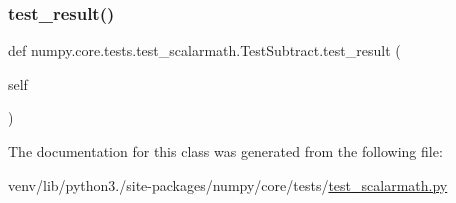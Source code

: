 \mbox{\label{classnumpy_1_1core_1_1tests_1_1test__scalarmath_1_1TestSubtract_a870a1e3e41e2d729632410ea8554a6f7}} 
\subsubsection{\texorpdfstring{test\+\_\+result()}{test\_result()}}
{\footnotesize\ttfamily def numpy.\+core.\+tests.\+test\+\_\+scalarmath.\+Test\+Subtract.\+test\+\_\+result (\begin{DoxyParamCaption}\item[{}]{self }\end{DoxyParamCaption})}



The documentation for this class was generated from the following file\+:\begin{DoxyCompactItemize}
\item 
venv/lib/python3./site-\/packages/numpy/core/tests/\hyperlink{test__scalarmath_8py}{test\+\_\+scalarmath.\+py}\end{DoxyCompactItemize}
